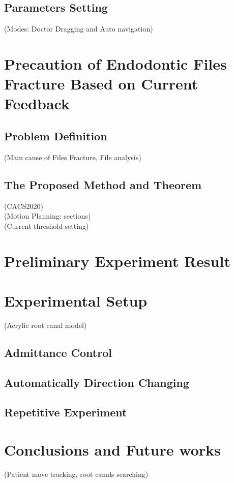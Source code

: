 \documentclass[12pt]{report}
\begin{document}
\begin{CJK}{UTF8}{bsmi}
\section{Parameters Setting}
(Modes: Doctor Dragging and Auto navigation)\\
\chapter{Precaution of Endodontic Files Fracture Based on Current Feedback}
\section{Problem Definition}   
(Main cause of Files Fracture, File analysis)\\
\section{The Proposed Method and Theorem}
(CACS2020)\\
(Motion Planning: sections)\\
(Current threshold setting)\\
\chapter{Preliminary Experiment Result}
\chapter{Experimental Setup}
(Acrylic root canal model)
\section{Admittance Control}
\section{Automatically Direction Changing}
\section{Repetitive Experiment}
\chapter{Conclusions and Future works}
(Patient move tracking, root canals searching)\\
\end{CJK}
\end{document}
